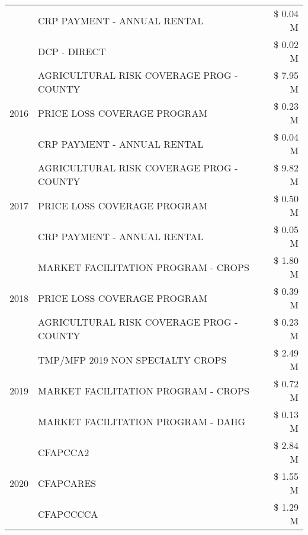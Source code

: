 \begin{tabular}{llr}
 & CRP PAYMENT - ANNUAL RENTAL & \$ 0.04 M \\
 & DCP - DIRECT & \$ 0.02 M \\
\cline{1-3}
\multirow[t]{3}{*}{2016} & AGRICULTURAL RISK COVERAGE PROG - COUNTY & \$ 7.95 M \\
 & PRICE LOSS COVERAGE PROGRAM & \$ 0.23 M \\
 & CRP PAYMENT - ANNUAL RENTAL & \$ 0.04 M \\
\cline{1-3}
\multirow[t]{3}{*}{2017} & AGRICULTURAL RISK COVERAGE PROG - COUNTY & \$ 9.82 M \\
 & PRICE LOSS COVERAGE PROGRAM & \$ 0.50 M \\
 & CRP PAYMENT - ANNUAL RENTAL & \$ 0.05 M \\
\cline{1-3}
\multirow[t]{3}{*}{2018} & MARKET FACILITATION PROGRAM - CROPS & \$ 1.80 M \\
 & PRICE LOSS COVERAGE PROGRAM & \$ 0.39 M \\
 & AGRICULTURAL RISK COVERAGE PROG - COUNTY & \$ 0.23 M \\
\cline{1-3}
\multirow[t]{3}{*}{2019} & TMP/MFP 2019 NON SPECIALTY CROPS & \$ 2.49 M \\
 & MARKET FACILITATION PROGRAM - CROPS & \$ 0.72 M \\
 & MARKET FACILITATION PROGRAM - DAHG & \$ 0.13 M \\
\cline{1-3}
\multirow[t]{3}{*}{2020} & CFAPCCA2 & \$ 2.84 M \\
 & CFAPCARES & \$ 1.55 M \\
 & CFAPCCCCA & \$ 1.29 M \\
\cline{1-3}
\bottomrule
\end{tabular}
